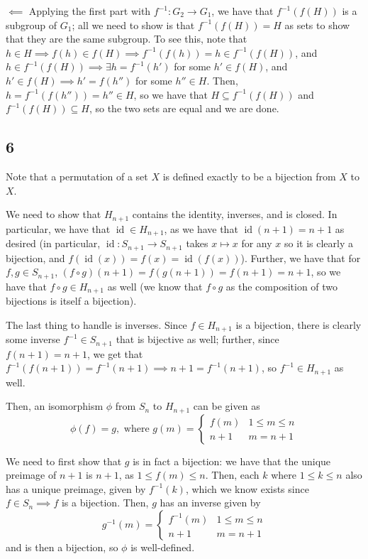 \documentclass[12pt,letterpaper]{article}
\theoremstyle{definition}
\DeclareMathOperator{\Id}{id}
\begin{document}
$\impliedby$ Applying the first part with $f^{-1}:G_{2} \rightarrow G_{1}$, we have that $f^{-1}(f(H))$ is a subgroup of $G_{1}$; all we need to show is that $f^{-1}(f(H)) = H$ as sets to show that they are the same subgroup. To see this, note that $h \in H \implies f(h) \in f(H) \implies f^{-1}(f(h)) = h \in f^{-1}(f(H))$, and $h \in f^{-1}(f(H)) \implies \exists h = f^{-1}(h')$ for some $h' \in f(H)$, and $h' \in f(H) \implies h' = f(h'')$ for some $h'' \in H$. Then, $h = f^{-1}(f(h'')) = h'' \in H$, so we have that $H \subseteq f^{-1}(f(H))$ and $f^{-1}(f(H)) \subseteq H$, so the two sets are equal and we are done.

\subsection*{6}

Note that a permutation of a set $X$ is defined exactly to be a bijection from $X$ to $X$.

We need to show that $H_{n+1}$ contains the identity, inverses, and is closed. In particular, we have that $\Id \in H_{n+1}$, as we have that $\Id(n+1) = n+1$ as desired (in particular, $\Id: S_{n+1} \rightarrow S_{n+1}$ takes $x \mapsto x$ for any $x$ so it is clearly a bijection, and $f(\Id(x)) = f(x) = \Id(f(x))$). Further, we have that for $f,g \in S_{n+1}$, $(f \circ g)(n+1) = f(g(n+1)) = f(n+1) = n + 1$, so we have that $f \circ g \in H_{n+1}$ as well (we know that $f\circ g$ as the composition of two bijections is itself a bijection).

The last thing to handle is inverses. Since $f \in H_{n+1}$ is a bijection, there is clearly some inverse $f^{-1} \in S_{n+1}$ that is bijective as well; further, since $f(n+1) = n + 1$, we get that $f^{-1}(f(n+1)) = f^{-1}(n+1) \implies n + 1 = f^{-1}(n+1)$, so $f^{-1} \in H_{n+1}$ as well.

Then, an isomorphism $\phi$ from $S_{n}$ to $H_{n+1}$ can be given as
\[
  \phi(f) = g, \text{ where } g(m) = \begin{cases}
    f(m) & 1 \leq m \leq n \\
    n + 1 & m = n + 1
  \end{cases}
\]

We need to first show that $g$ is in fact a bijection: we have that the unique preimage of $n+1$ is $n+1$, as $1 \leq f(m) \leq n$. Then, each $k$ where $1 \leq k \leq n$ also has a unique preimage, given by $f^{-1}(k)$, which we know exists since $f \in S_{n} \implies f$ is a bijection. Then, $g$ has an inverse given by
\[
  g^{-1}(m) = \begin{cases}
    f^{-1}(m) & 1 \leq m \leq n \\
    n + 1 & m = n + 1
  \end{cases}
\]
and is then a bijection, so $\phi$ is well-defined.
\end{document}
